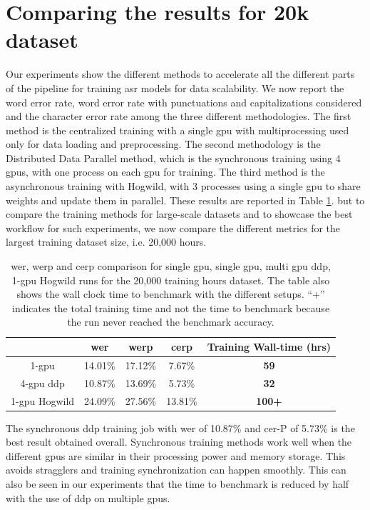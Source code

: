 \section{Comparing the results for 20k dataset}
\label{section:20000wer}
Our experiments show the different methods to accelerate all the different parts of the pipeline for training \acrshort{asr} models for data scalability. We now report the word error rate, word error rate with punctuations and capitalizations considered and the character error rate among the three different methodologies. The first method is the centralized training with a single \acrshort{gpu} with multiprocessing used only for data loading and preprocessing. The second methodology is the Distributed Data Parallel method, which is the synchronous training using 4 \acrshort{gpu}s, with one process on each \acrshort{gpu} for training. The third method is the asynchronous training with Hogwild, with 3 processes using a single \acrshort{gpu} to share weights and update them in parallel. These results are reported in Table \ref{table:overall_wer}. but to compare the training methods for large-scale datasets and to showcase the best workflow for such experiments, we now compare the different metrics for the largest training dataset size, i.e. 20,000 hours. 
\begin{table}[ht]
\centering
\begin{tabular}{c | c c c | c }
\hline
     & \acrshort{wer} & \acrshort{werp} & \acrshort{cerp} & Training Wall-time (hrs)\\
 \hline
  1-\acrshort{gpu} & 14.01\% & 17.12\% & 7.67\% & \textbf{59} \\
  4-\acrshort{gpu} \acrshort{ddp} & 10.87\% & 13.69\% & 5.73\% & \textbf{32} \\
  1-\acrshort{gpu} Hogwild & 24.09\% & 27.56\% & 13.81\% & \textbf{100+} \\
 \hline
\end{tabular}
\caption{\label{table:overall_wer} \acrshort{wer}, \acrshort{werp} and \acrshort{cerp} comparison for single \acrshort{gpu}, single \acrshort{gpu}, multi \acrshort{gpu} \acrshort{ddp}, 1-\acrshort{gpu} Hogwild runs for the 20,000 training hours dataset. The table also shows the wall clock time to benchmark with the different setups. ``+'' indicates the total training time and not the time to benchmark because the run never reached the benchmark accuracy.}
\end{table}

The synchronous \acrshort{ddp} training job with \acrshort{wer} of 10.87\% and \acrshort{cer}-P of 5.73\% is the best result obtained overall. Synchronous training methods work well when the different \acrshort{gpu}s are similar in their processing power and memory storage. This avoids stragglers and training synchronization can happen smoothly. This can also be seen in our experiments that the time to benchmark is reduced by half with the use of \acrshort{ddp} on multiple \acrshort{gpu}s. 

